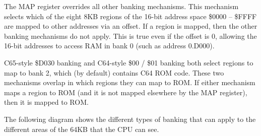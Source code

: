 The MAP register overrides all other banking mechanisms. This mechanism
selects which of the eight 8KB regions of the 16-bit address space \$0000 --
\$FFFF are mapped to other addresses via an offset. If a region is mapped,
then the other banking mechanisms do not apply. This is true even if the
offset is 0, allowing the 16-bit addresses to access RAM in bank 0 (such as
address 0.D000).

C65-style \$D030 banking and C64-style \$00 / \$01 banking both select
regions to map to bank 2, which (by default) contains C64 ROM code. These two
mechanisms overlap in which regions they can map to ROM. If either mechanism
maps a region to ROM (and it is not mapped elsewhere by the MAP register),
then it is mapped to ROM.

The following diagram shows the different types of banking that can
apply to the different areas of the 64KB that the CPU can see.

